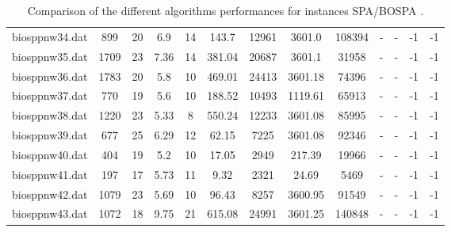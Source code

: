 \begin{table}[!ht]
{\begin{tabular}{lcccccccccccc}
biosppnw34.dat & 899 & 20 & 6.9 & 14 & 143.7 & 12961 & 3601.0 & 108394 &  - &  - & -1 & -1 \\
biosppnw35.dat & 1709 & 23 & 7.36 & 14 & 381.04 & 20687 & 3601.1 & 31958 &  - &  - & -1 & -1 \\
biosppnw36.dat & 1783 & 20 & 5.8 & 10 & 469.01 & 24413 & 3601.18 & 74396 &  - &  - & -1 & -1 \\
biosppnw37.dat & 770 & 19 & 5.6 & 10 & 188.52 & 10493 & 1119.61 & 65913 &  - &  - & -1 & -1 \\
biosppnw38.dat & 1220 & 23 & 5.33 & 8 & 550.24 & 12233 & 3601.08 & 85995 &  - &  - & -1 & -1 \\
biosppnw39.dat & 677 & 25 & 6.29 & 12 & 62.15 & 7225 & 3601.08 & 92346 &  - &  - & -1 & -1 \\
biosppnw40.dat & 404 & 19 & 5.2 & 10 & 17.05 & 2949 & 217.39 & 19966 &  - &  - & -1 & -1 \\
biosppnw41.dat & 197 & 17 & 5.73 & 11 & 9.32 & 2321 & 24.69 & 5469 &  - &  - & -1 & -1 \\
biosppnw42.dat & 1079 & 23 & 5.69 & 10 & 96.43 & 8257 & 3600.95 & 91549 &  - &  - & -1 & -1 \\
biosppnw43.dat & 1072 & 18 & 9.75 & 21 & 615.08 & 24991 & 3601.25 & 140848 &  - &  - & -1 & -1 \\
\bottomrule
\end{tabular}
}%
\caption{Comparison of the different algorithms performances for instances SPA/BOSPA .}
\end{table}
